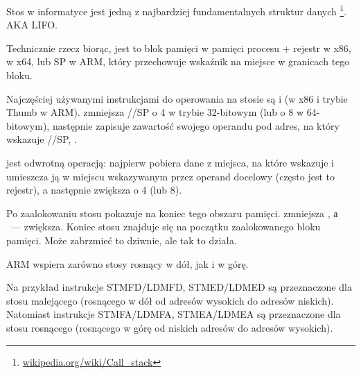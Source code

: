 \mysection{\Stack}
\label{sec:stack}
\myindex{\Stack}

Stos w informatyce jest jedną z najbardziej fundamentalnych struktur danych
\footnote{\href{http://go.yurichev.com/17119}{wikipedia.org/wiki/Call\_stack}}.
\ac{AKA} \ac{LIFO}.

Technicznie rzecz biorąc, jest to blok pamięci w pamięci procesu + rejestr \ESP w x86, \RSP w x64, lub \ac{SP} w ARM, który przechowuje wskaźnik na miejsce w granicach tego bloku.

Najczęściej używanymi instrukcjami do operowania na stosie są \PUSH i \POP (w x86 i trybie Thumb w ARM).
\PUSH zmniejsza \ESP/\RSP/\ac{SP} o 4 w trybie 32-bitowym (lub o 8 w 64-bitowym),
następnie zapisuje zawartość swojego operandu pod adres, na który wskazuje \ESP/\RSP/\ac{SP}, .

\POP jest odwrotną operacją: najpierw pobiera dane z miejsca, na które wskazuje  i umieszcza ją w miejscu wskazywanym przez operand docelowy
(często jest to rejestr), a następnie zwiększa  o 4 (lub 8).

Po zaalokowaniu stosu  pokazuje na koniec tego obszaru pamięci.
\PUSH zmniejsza , а \POP~--- zwiększa.
Koniec stosu znajduje się na początku zaalokowanego bloku pamięci. Może zabrzmieć to dziwnie, ale tak to działa.

ARM wspiera zarówno stosy rosnący w dół, jak i w górę.


Na przykład instrukcje \ac{STMFD}/\ac{LDMFD}, \ac{STMED}/\ac{LDMED} są przeznaczone dla stosu malejącego (rosnącego w dół od adresów wysokich do adresów niskich).\\
Natomiast instrukcje \ac{STMFA}/\ac{LDMFA}, \ac{STMEA}/\ac{LDMEA} są przeznaczone dla stosu rosnącego (rosnącego w górę od niskich adresów do adresów wysokich).


